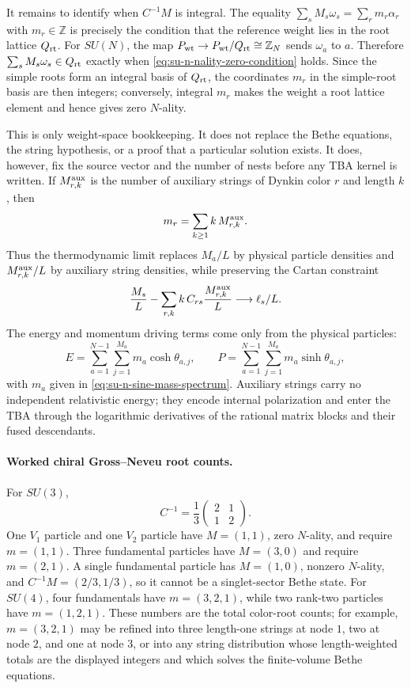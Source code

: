 It remains to identify when \(C^{-1}M\) is integral.  The equality
\(\sum_sM_s\omega_s=\sum_rm_r\alpha_r\) with \(m_r\in\mathbb Z\) is precisely the
condition that the reference weight lies in the root lattice \(Q_{\rm rt}\).
For \(SU(N)\), the map \(P_{\rm wt}\to P_{\rm wt}/Q_{\rm rt}\cong\mathbb Z_N\)
sends \(\omega_a\) to \(a\).  Therefore
\(\sum_sM_s\omega_s\in Q_{\rm rt}\) exactly when
\eqref{eq:su-n-nality-zero-condition} holds.  Since the simple roots form an
integral basis of \(Q_{\rm rt}\), the coordinates \(m_r\) in the simple-root
basis are then integers; conversely, integral \(m_r\) makes the weight a root
lattice element and hence gives zero \(N\)-ality.

This is only weight-space bookkeeping.  It does not replace the Bethe
equations, the string hypothesis, or a proof that a particular solution exists.
It does, however, fix the source vector and the number of nests before any TBA
kernel is written.  If \(M_{r,k}^{\rm aux}\) is the number of auxiliary strings
of Dynkin color \(r\) and length \(k\), then
\begin{equation}
  m_r=\sum_{k\ge1}k\,M_{r,k}^{\rm aux}.
  \label{eq:nested-string-length-root-count}
\end{equation}
Thus the thermodynamic limit replaces \(M_a/L\) by physical particle densities
and \(M_{r,k}^{\rm aux}/L\) by auxiliary string densities, while preserving the
Cartan constraint
\[
  \frac{M_s}{L}-\sum_{r,k}k\,C_{rs}\frac{M_{r,k}^{\rm aux}}{L}
  \longrightarrow \ell_s/L .
\]
The energy and momentum driving terms come only from the physical particles:
\begin{equation}
  E=\sum_{a=1}^{N-1}\sum_{j=1}^{M_a}m_a\cosh\theta_{a,j},\qquad
  P=\sum_{a=1}^{N-1}\sum_{j=1}^{M_a}m_a\sinh\theta_{a,j},
  \label{eq:cgn-pcm-physical-driving-terms}
\end{equation}
with \(m_a\) given in \eqref{eq:su-n-sine-mass-spectrum}.  Auxiliary strings
carry no independent relativistic energy; they encode internal polarization and
enter the TBA through the logarithmic derivatives of the rational matrix
blocks and their fused descendants.

\paragraph{Worked chiral Gross--Neveu root counts.}
For \(SU(3)\),
\[
  C^{-1}=\frac13
  \begin{pmatrix}2&1\\1&2\end{pmatrix}.
\]
One \(V_1\) particle and one \(V_2\) particle have \(M=(1,1)\), zero
\(N\)-ality, and require \(m=(1,1)\).  Three fundamental particles have
\(M=(3,0)\) and require \(m=(2,1)\).  A single fundamental particle has
\(M=(1,0)\), nonzero \(N\)-ality, and \(C^{-1}M=(2/3,1/3)\), so it cannot be a
singlet-sector Bethe state.  For \(SU(4)\), four fundamentals have
\(m=(3,2,1)\), while two rank-two particles have \(m=(1,2,1)\).  These numbers
are the total color-root counts; for example, \(m=(3,2,1)\) may be refined into
three length-one strings at node \(1\), two at node \(2\), and one at node \(3\),
or into any string distribution whose length-weighted totals are the displayed
integers and which solves the finite-volume Bethe equations.

